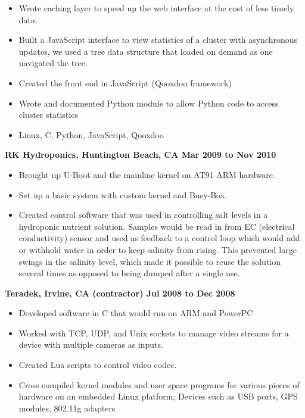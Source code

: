 \documentclass{res}
\begin{document}
\begin{resume}
\begin{itemize}
\item Wrote caching layer to speed up the web interface at the cost of
less timely data.

\item Built a JavaScript interface to view statistics of a cluster with
asynchronous updates, we used a tree data structure that loaded on demand
as one navigated the tree.

\item Created the front end in JavaScript (Qooxdoo framework)

\item Wrote and documented Python module to allow Python code to access
cluster statistics

\item Linux, C, Python, JavaScript, Qooxdoo

\end{itemize}

{\large \bf RK Hydroponics, Huntington Beach, CA \hfill Mar 2009 to Nov
2010} \begin{itemize}

\item Brought up U-Boot and the mainline kernel on AT91 ARM hardware.

\item Set up a basic system with custom kernel and Busy-Box.

\item Created control software that was used in controlling salt levels
in a hydroponic nutrient solution.  Samples would be read in from EC
(electrical conductivity) sensor and used as feedback to a control loop
which would add or withhold water in order to keep salinity from rising.
This prevented large swings in the salinity level, which made it possible
to reuse the solution several times as opposed to being dumped after a
single use.

\end{itemize}

{\large \bf Teradek, Irvine, CA (contractor) \hfill Jul 2008 to Dec 2008}
\begin{itemize}
\item Developed software in C that would run on ARM and PowerPC
\item Worked with TCP, UDP, and Unix sockets to manage video streams for
a device with multiple cameras as inputs.
\item Created Lua scripts to control video codec.
\item Cross compiled kernel modules and user space programs for various
pieces of hardware on an embedded Linux platform; Devices such as USB
ports, GPS modules, 802.11g adapters
\end{itemize}


\end{resume}
\end{document}

